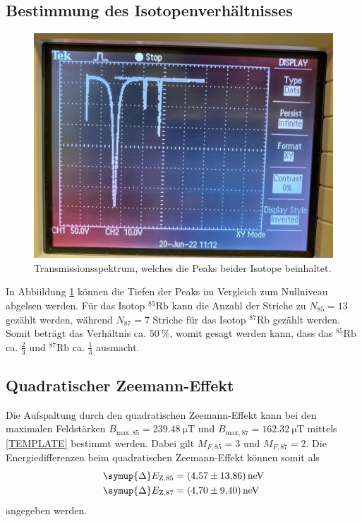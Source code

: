 \subsection{Bestimmung des Isotopenverhältnisses}
\begin{figure}
    \centering
    \caption{Transmissionsspektrum, welches die Peaks beider Isotope beinhaltet.}
    \label{fig:transmissionsspektrum}
    \includegraphics[width = 0.7 \textwidth]{data_scripts/index.jpg}
\end{figure}
In Abbiildung \ref{fig:transmissionsspektrum} können die Tiefen der Peaks im Vergleich zum Nullniveau abgelsen werden.
Für das Isotop $^{85}\text{Rb}$ kann die Anzahl der Striche zu $N_{85}=13$ gezählt werden, während 
$N_{87} = 7$ Striche für das Isotop $^{87}\text{Rb}$ gezählt werden.
Somit beträgt das Verhältnis ca. $\qty{50}{\percent}$, womit gesagt werden kann, dass 
das $^{85}\text{Rb}$ ca. $\frac{2}{3}$ und $^{87}\text{Rb}$ ca. $\frac{1}{3}$ ausmacht.
\subsection{Quadratischer Zeemann-Effekt}
Die Aufspaltung durch den quadratischen Zeemann-Effekt kann bei den maximalen Feldstärken 
$B_{\text{max},85} = \qty{239.48}{\micro\tesla}$ und $B_{\text{max},87} = \qty{162.32}{\micro\tesla}$ mittels \eqref{TEMPLATE} bestimmt werden.
Dabei gilt $M_{F, 85} = 3$ und $M_{F, 87} = 2$.
Die Energiedifferenzen beim quadratischen Zeemann-Effekt können somit als
\begin{align*}
    \symup{\Delta}E_{\text{Z}, 85} &= \qty{4.57(1386)}{\nano\electronvolt} \\
    \symup{\Delta}E_{\text{Z}, 87} &= \qty{4.70(940)}{\nano\electronvolt} 
\end{align*} 
angegeben werden.